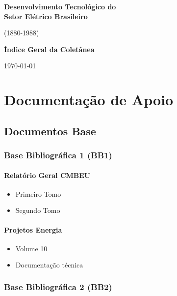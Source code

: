 \documentclass[12pt,a4paper]{report}
\begin{document}
\begin{titlepage}
\begin{center}
\vspace*{2cm}
{\Huge\textbf{Desenvolvimento Tecnológico do\\Setor Elétrico Brasileiro}}
\vspace{1.5cm}

{\Large (1880-1988)}
\vspace{2cm}

{\large\textbf{Índice Geral da Coletânea}}
\vfill

{\large\today}
\end{center}
\end{titlepage}

\tableofcontents
\newpage

\part{Documentação de Apoio}

\chapter{Documentos Base}

\section{Base Bibliográfica 1 (BB1)}
\subsection{Relatório Geral CMBEU}
\begin{itemize}[leftmargin=*]
    \item Primeiro Tomo
    \item Segundo Tomo
\end{itemize}

\subsection{Projetos Energia}
\begin{itemize}[leftmargin=*]
    \item Volume 10
    \item Documentação técnica
\end{itemize}

\section{Base Bibliográfica 2 (BB2)}
\end{document}
